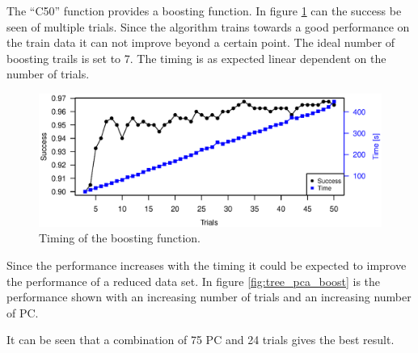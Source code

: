 The ``C50'' function provides a boosting function.
In figure \ref{fig:tree_timing} can the success be seen of multiple trials.
Since the algorithm trains towards a good performance on the train data it can not improve beyond a certain point.
The ideal number of boosting trails is set to 7.
The timing is as expected linear dependent on the number of trials.

\begin{figure}[H]
\includegraphics[width = \textwidth]{graphics/tree_timing_one}
\caption[Timing of the boosting function.]{Timing of the boosting function.}
\label{fig:tree_timing}
\end{figure}

Since the performance increases with the timing it could be expected to improve the performance of a reduced data set.
In figure \ref{fig:tree_pca_boost} is the performance shown with an increasing number of trials and an increasing number of PC.

It can be seen that a combination of 75 PC and 24 trials gives the best result.

